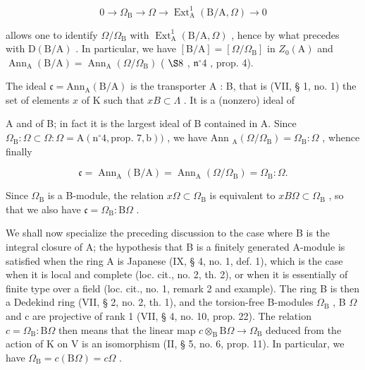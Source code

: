 \[
0 \to \Omega_ {\mathrm{B}} \to \Omega \to \operatorname{Ext} _ {\mathrm{A}} ^ {1} (\mathrm{B/A}, \Omega) \to 0
\]

allows one to identify \(\Omega/\Omega_{\mathrm{B}}\) with \(\operatorname{Ext}_{\mathrm{A}}^{1}(\mathrm{B}/\mathrm{A},\Omega)\) , hence by what precedes with \(\mathrm{D}(\mathrm{B}/\mathrm{A})\) . In particular, we have \([\mathrm{B}/\mathrm{A}] = [\Omega/\Omega_{\mathrm{B}}]\) in \(Z_{0}(\mathrm{A})\) and \(\operatorname{Ann}_{\mathrm{A}}(\mathrm{B}/\mathrm{A}) = \operatorname{Ann}_{\mathrm{A}}(\Omega/\Omega_{\mathrm{B}})\) ( \(\S 8\) , \(\mathfrak{n}^{\circ}4\) , prop. 4).

The ideal \(\mathfrak{c} = \mathrm{Ann}_{\mathrm{A}}(\mathrm{B / A})\) is the transporter A : B, that is (VII, § 1, no. 1) the set of elements \(x\) of K such that \(xB \subset \Lambda\) . It is a (nonzero) ideal of

A and of B; in fact it is the largest ideal of B contained in A. Since \(\Omega_{\mathrm{B}} : \Omega \subset \Omega : \Omega = \mathrm{A} (\mathrm{n}^{\circ} 4, \text{prop. } 7, \mathrm{b}))\) , we have Ann \(_{\mathrm{A}}(\Omega/\Omega_{\mathrm{B}}) = \Omega_{\mathrm{B}} : \Omega\) , whence finally

\[
\mathfrak {c} = \operatorname{Ann} _ {\mathrm{A}} (\mathrm{B/A}) = \operatorname{Ann} _ {\mathrm{A}} (\Omega / \Omega_ {\mathrm{B}}) = \Omega_ {\mathrm{B}}: \Omega .
\]

Since \(\Omega_{\mathrm{B}}\) is a B-module, the relation \(x\Omega \subset \Omega_{\mathrm{B}}\) is equivalent to \(xB\Omega \subset \Omega_{\mathrm{B}}\) , so that we also have \(\mathfrak{c} = \Omega_{\mathrm{B}}: \mathrm{B}\Omega\) .

We shall now specialize the preceding discussion to the case where B is the integral closure of A; the hypothesis that B is a finitely generated A-module is satisfied when the ring A is Japanese (IX, § 4, no. 1, def. 1), which is the case when it is local and complete (loc. cit., no. 2, th. 2), or when it is essentially of finite type over a field (loc. cit., no. 1, remark 2 and example). The ring B is then a Dedekind ring (VII, § 2, no. 2, th. 1), and the torsion-free B-modules \(\Omega_{\mathrm{B}}\) , B \(\Omega\) and c are projective of rank 1 (VII, § 4, no. 10, prop. 22). The relation \(c = \Omega_{\mathrm{B}} : \mathrm{B}\Omega\) then means that the linear map \(c \otimes_{\mathrm{B}} \mathrm{B}\Omega \to \Omega_{\mathrm{B}}\) deduced from the action of K on V is an isomorphism (II, § 5, no. 6, prop. 11). In particular, we have \(\Omega_{\mathrm{B}} = c(\mathrm{B}\Omega) = c\Omega\) .

